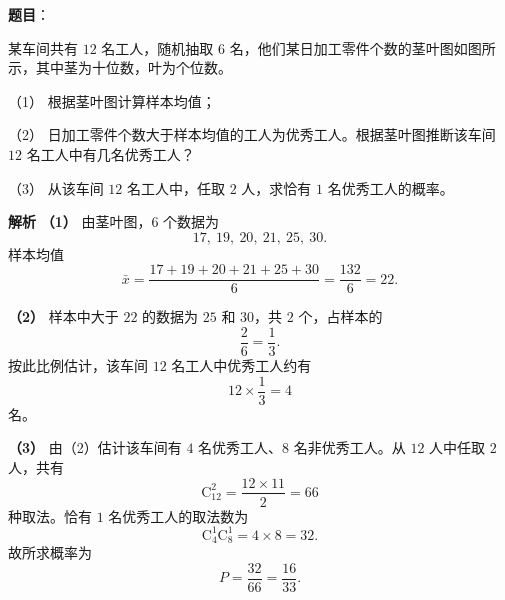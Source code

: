 \begin{answer}

\textbf{题目}：

某车间共有 $12$ 名工人，随机抽取 $6$ 名，他们某日加工零件个数的茎叶图如图所示，其中茎为十位数，叶为个位数。
\nopagebreak[4]
\begin{center}\end{center}
\nopagebreak[4]
（1） 根据茎叶图计算样本均值；

（2） 日加工零件个数大于样本均值的工人为优秀工人。根据茎叶图推断该车间 $12$ 名工人中有几名优秀工人？

（3） 从该车间 $12$ 名工人中，任取 $2$ 人，求恰有 $1$ 名优秀工人的概率。

\textbf{解析}
\textbf{（1）}
由茎叶图，$6$ 个数据为
\nopagebreak[4]
\[17,\ 19,\ 20,\ 21,\ 25,\ 30.\]
样本均值
\nopagebreak[4]
\[\bar x=\frac{17+19+20+21+25+30}{6}=\frac{132}{6}=22.\]

\textbf{（2）}
样本中大于 $22$ 的数据为 $25$ 和 $30$，共 $2$ 个，占样本的
\nopagebreak[4]
\[\frac26=\frac13.\]
按此比例估计，该车间 $12$ 名工人中优秀工人约有
\nopagebreak[4]
\[12\times\frac13=4\]
名。

\textbf{（3）}
由（2）估计该车间有 $4$ 名优秀工人、$8$ 名非优秀工人。从 $12$ 人中任取 $2$ 人，共有
\nopagebreak[4]
\[\mathrm C_{12}^2=\frac{12\times11}{2}=66\]
种取法。恰有 $1$ 名优秀工人的取法数为
\nopagebreak[4]
\[\mathrm C_4^1\mathrm C_8^1=4\times8=32.\]
故所求概率为
\nopagebreak[4]
\[P=\frac{32}{66}=\frac{16}{33}.\]




\end{answer}
